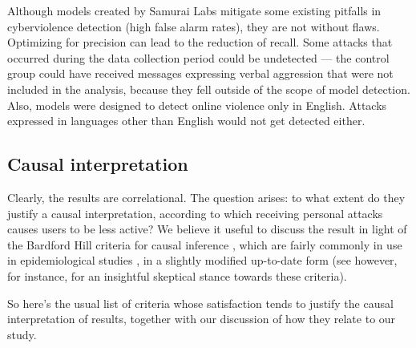 \documentclass[a4paper,fleqn]{cas-dc}
\begin{document}
Although models created by Samurai Labs mitigate some existing pitfalls
in cyberviolence detection (high false alarm rates), they are not
without flaws. Optimizing for precision can lead to the reduction of
recall. Some attacks that occurred during the data collection period
could be undetected --- the control group could have received messages
expressing verbal aggression that were not included in the analysis,
because they fell outside of the scope of model detection. Also, models
were designed to detect online violence only in English. Attacks
expressed in languages other than English would not get detected either.






\subsection{Causal interpretation}

Clearly, the results are correlational. The question arises: to what
extent do they justify a causal interpretation, according to which
receiving personal attacks causes users to be less active? We believe it
useful to discuss the result in light of the Bardford Hill criteria for
causal inference  \citep{hill1965environment}, which are fairly commonly in use in
epidemiological studies \citep{lucas2005association}, in a slightly
modified up-to-date form \citep{howick2009evolution} (see
however, for instance, \citep{pearl2018why} for an insightful
skeptical stance towards these criteria).

So here's the usual list of criteria whose satisfaction tends to justify
the causal interpretation of results, together with our discussion of
how they relate to our study.

\vspace{2mm}
\end{document}
